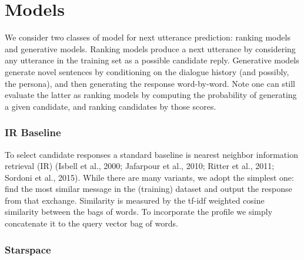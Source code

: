 \documentclass[11pt,a4paper]{article}
\begin{document}
\section{Models}

We consider two classes of model for next utterance prediction: ranking models and generative models.
Ranking models produce a next utterance by considering any utterance in the training set as a possible candidate reply. Generative models 
 generate novel sentences by conditioning on the dialogue history (and possibly, the persona), and then generating the response word-by-word. Note one can still evaluate the latter as ranking models by computing the probability of generating a given candidate, and ranking candidates by those scores.







\ifarxiv
\subsubsection{IR Baseline}
To select candidate responses a standard baseline is nearest neighbor information retrieval (IR) (Isbell et al., 2000; Jafarpour et al., 2010; Ritter et al., 2011; Sordoni et al., 2015). 
While there are many variants, we adopt the simplest one: find the most similar message in the (training) dataset and output the response from that exchange. Similarity is measured by the tf-idf weighted cosine similarity between the bags of words. To incorporate the profile we simply concatenate it to the query vector bag of words. 


\subsubsection{Starspace}
\end{document}
